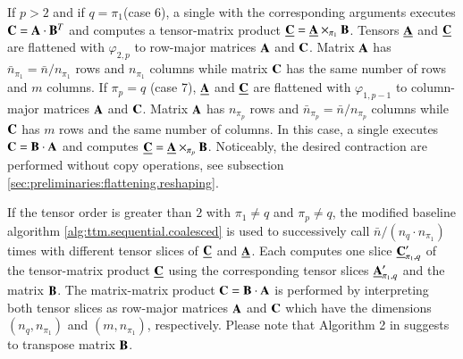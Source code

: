 If $p>2$ and if $q=\pi_1$(case 6), a single  with the corresponding arguments executes $\mathbf{C} = \mathbf{A} \cdot \mathbf{B}^T$ and computes a tensor-matrix product $\underline{\mathbf{C}} = \underline{\mathbf{A}} \times_{\pi_1} \mathbf{B}$.
Tensors $\underline{\mathbf{A}}$ and $\underline{\mathbf{C}}$ are flattened with $\varphi_{2,p}$ to row-major matrices $\mathbf{A}$ and $\mathbf{C}$.
Matrix $\mathbf{A}$ has $\bar{n}_{\pi_1} = \bar{n} / n_{\pi_1}$ rows and $n_{\pi_1}$ columns while matrix $\mathbf{C}$ has the same number of rows and $m$ columns.
If $\pi_p=q$ (case 7), $\underline{\mathbf{A}}$ and $\underline{\mathbf{C}}$ are flattened with $\varphi_{1,p-1}$ to column-major matrices $\mathbf{A}$ and $\mathbf{C}$.
Matrix $\mathbf{A}$ has $n_{\pi_p}$ rows and $\bar{n}_{\pi_p} =  \bar{n} / n_{\pi_p}$ columns while $\mathbf{C}$ has $m$ rows and the same number of columns.
In this case, a single  executes $\mathbf{C} = \mathbf{B} \cdot \mathbf{A}$ and computes $\underline{\mathbf{C}} = \underline{\mathbf{A}} \times_{\pi_p} \mathbf{B}$.
Noticeably, the desired contraction are performed without copy operations, see subsection \ref{sec:preliminaries:flattening.reshaping}.

If the tensor order is greater than $2$ with $\pi_1\neq q$ and $\pi_p \neq q$, the modified baseline algorithm \ref{alg:ttm.sequential.coalesced} is used to successively call $\bar{n} / (n_q \cdot n_{\pi_1})$ times  with different tensor slices of $\underline{\mathbf{C}}$ and $\underline{\mathbf{A}}$.
Each  computes one slice $\underline{\mathbf{C}}_{\pi_1,q}'$ of the tensor-matrix product $\underline{\mathbf{C}}$ using the corresponding tensor slices $\underline{\mathbf{A}}_{\pi_1,q}'$ and the matrix $\mathbf{B}$.
The matrix-matrix product $\mathbf{C} = \mathbf{B} \cdot \mathbf{A}$ is performed by interpreting both tensor slices as row-major matrices $\mathbf{A}$ and $\mathbf{C}$ which have the dimensions $(n_q,n_{\pi_1})$ and $(m,n_{\pi_1})$, respectively.
Please note that Algorithm 2 in \cite{li:2015:input} suggests to transpose matrix $\mathbf{B}$.

